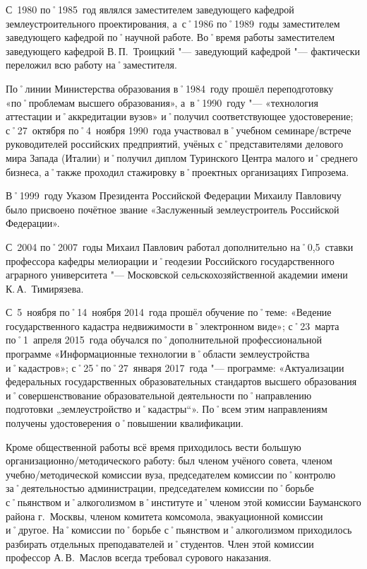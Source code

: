 С~1980 по˚1985~год являлся заместителем заведующего кафедрой землеустроительного проектирования, а~с˚1986 по˚1989~годы заместителем заведующего кафедрой по˚научной работе. Во˚время работы заместителем заведующего кафедрой В.\,П.~Троицкий "--- заведующий кафедрой "--- фактически переложил всю работу на˚заместителя.

По˚линии Министерства образования в˚1984~году прошёл переподготовку «по˚проблемам высшего образования», а~в˚1990~году "--- «технология аттестации и˚аккредитации вузов» и˚получил соответствующее удостоверение; с˚27~октября по˚4~ноября 1990~года участвовал в˚учебном семинаре\-/встрече руководителей российских предприятий, учёных с˚представителями делового мира Запада (Италии) и˚получил диплом Туринского Центра малого и˚среднего бизнеса, а˚также проходил стажировку в˚проектных организациях Гипрозема.

В˚1999~году Указом Президента Российской Федерации Михаилу Павловичу было присвоено  почётное звание «Заслуженный землеустроитель Российской Федерации». 

С~2004 по˚2007~годы Михаил Павлович работал дополнительно на˚0,5~ставки профессора кафедры мелиорации и˚геодезии Российского государственного аграрного университета "--- Московской сельскохозяйственной академии имени К.\,А.~Тимирязева.

С~5~ноября по˚14~ноября 2014~года прошёл обучение по˚теме: «Ведение государственного кадастра недвижимости в˚электронном виде»; с˚23~марта по˚1~апреля 2015~года обучался по˚дополнительной профессиональной программе «Информационные технологии в˚области землеустройства и˚кадастров»; с˚25˚по˚27~января 2017~года "--- программе: «Актуализации федеральных государственных образовательных стандартов высшего образования и˚совершенствование образовательной деятельности по˚направлению подготовки „землеустройство и˚кадастры“». По˚всем этим направлениям получены удостоверения о˚повышении квалификации. 

Кроме общественной работы всё время приходилось вести большую организационно\-/методического работу: был членом учёного совета, членом учебно\-/методической комиссии вуза, председателем комиссии по˚контролю за˚деятельностью администрации, председателем комиссии по˚борьбе с˚пьянством и˚алкоголизмом в˚институте и˚членом этой комиссии Бауманского района г.~Москвы, членом комитета комсомола, эвакуационной комиссии и˚другое. На˚комиссии по˚борьбе с˚пьянством и˚алкоголизмом приходилось разбирать отдельных преподавателей и˚студентов. Член этой комиссии профессор А.\,В.~Маслов всегда требовал сурового наказания.

